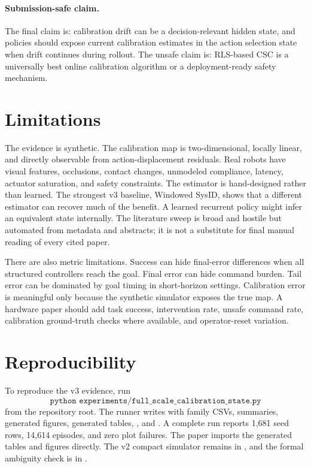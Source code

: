 \documentclass{article}
\begin{document}
\paragraph{Submission-safe claim.}
The final claim is: calibration drift can be a decision-relevant hidden state,
and policies should expose current calibration estimates in the action
selection state when drift continues during rollout. The unsafe claim is:
RLS-based CSC is a universally best online calibration algorithm or a
deployment-ready safety mechanism.

\section{Limitations}

The evidence is synthetic. The calibration map is two-dimensional, locally
linear, and directly observable from action-displacement residuals. Real
robots have visual features, occlusions, contact changes, unmodeled compliance,
latency, actuator saturation, and safety constraints. The estimator is
hand-designed rather than learned. The strongest v3 baseline, Windowed SysID,
shows that a different estimator can recover much of the benefit. A learned
recurrent policy might infer an equivalent state internally. The literature
sweep is broad and hostile but automated from metadata and abstracts; it is not
a substitute for final manual reading of every cited paper.

There are also metric limitations. Success can hide final-error differences
when all structured controllers reach the goal. Final error can hide command
burden. Tail error can be dominated by goal timing in short-horizon settings.
Calibration error is meaningful only because the synthetic simulator exposes
the true map. A hardware paper should add task success, intervention rate,
unsafe command rate, calibration ground-truth checks where available, and
operator-reset variation.

\section{Reproducibility}

To reproduce the v3 evidence, run
\[
\texttt{python experiments/full\_scale\_calibration\_state.py}
\]
from the repository root. The runner writes  with
family CSVs, summaries, generated figures, generated tables,
, and . A complete run reports
1,681 seed rows, 14,614 episodes, and zero plot failures. The paper imports the
generated tables and figures directly. The v2 compact simulator remains in
, and the formal ambiguity check
is in .
\end{document}
